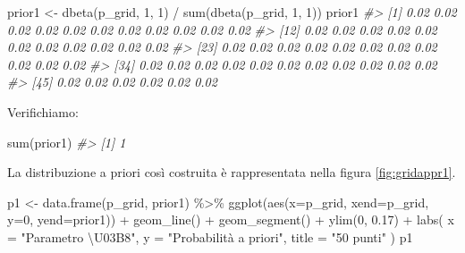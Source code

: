 \documentclass[
]{memoir}
\newenvironment{Shaded}{\begin{snugshade}}{\end{snugshade}}
\newcommand{\AttributeTok}[1]{\textcolor[rgb]{0.77,0.63,0.00}{#1}}
\newcommand{\CommentTok}[1]{\textcolor[rgb]{0.56,0.35,0.01}{\textit{#1}}}
\newcommand{\DecValTok}[1]{\textcolor[rgb]{0.00,0.00,0.81}{#1}}
\newcommand{\FloatTok}[1]{\textcolor[rgb]{0.00,0.00,0.81}{#1}}
\newcommand{\FunctionTok}[1]{\textcolor[rgb]{0.00,0.00,0.00}{#1}}
\newcommand{\NormalTok}[1]{#1}
\newcommand{\OtherTok}[1]{\textcolor[rgb]{0.56,0.35,0.01}{#1}}
\newcommand{\SpecialCharTok}[1]{\textcolor[rgb]{0.00,0.00,0.00}{#1}}
\newcommand{\StringTok}[1]{\textcolor[rgb]{0.31,0.60,0.02}{#1}}
\begin{document}
\begin{Shaded}
\begin{Highlighting}[]
\NormalTok{prior1 }\OtherTok{\textless{}{-}} \FunctionTok{dbeta}\NormalTok{(p\_grid, }\DecValTok{1}\NormalTok{, }\DecValTok{1}\NormalTok{) }\SpecialCharTok{/} \FunctionTok{sum}\NormalTok{(}\FunctionTok{dbeta}\NormalTok{(p\_grid, }\DecValTok{1}\NormalTok{, }\DecValTok{1}\NormalTok{))}
\NormalTok{prior1}
\CommentTok{\#\textgreater{}  [1] 0.02 0.02 0.02 0.02 0.02 0.02 0.02 0.02 0.02 0.02 0.02}
\CommentTok{\#\textgreater{} [12] 0.02 0.02 0.02 0.02 0.02 0.02 0.02 0.02 0.02 0.02 0.02}
\CommentTok{\#\textgreater{} [23] 0.02 0.02 0.02 0.02 0.02 0.02 0.02 0.02 0.02 0.02 0.02}
\CommentTok{\#\textgreater{} [34] 0.02 0.02 0.02 0.02 0.02 0.02 0.02 0.02 0.02 0.02 0.02}
\CommentTok{\#\textgreater{} [45] 0.02 0.02 0.02 0.02 0.02 0.02}
\end{Highlighting}
\end{Shaded}

\noindent
Verifichiamo:

\begin{Shaded}
\begin{Highlighting}[]
\FunctionTok{sum}\NormalTok{(prior1)}
\CommentTok{\#\textgreater{} [1] 1}
\end{Highlighting}
\end{Shaded}

\noindent
La distribuzione a priori così costruita è rappresentata nella figura \ref{fig:gridappr1}.

\begin{Shaded}
\begin{Highlighting}[]
\NormalTok{p1 }\OtherTok{\textless{}{-}} \FunctionTok{data.frame}\NormalTok{(p\_grid, prior1) }\SpecialCharTok{\%\textgreater{}\%}
  \FunctionTok{ggplot}\NormalTok{(}\FunctionTok{aes}\NormalTok{(}\AttributeTok{x=}\NormalTok{p\_grid, }\AttributeTok{xend=}\NormalTok{p\_grid, }\AttributeTok{y=}\DecValTok{0}\NormalTok{, }\AttributeTok{yend=}\NormalTok{prior1)) }\SpecialCharTok{+}
  \FunctionTok{geom\_line}\NormalTok{() }\SpecialCharTok{+}
  \FunctionTok{geom\_segment}\NormalTok{() }\SpecialCharTok{+}
  \FunctionTok{ylim}\NormalTok{(}\DecValTok{0}\NormalTok{, }\FloatTok{0.17}\NormalTok{) }\SpecialCharTok{+}
  \FunctionTok{labs}\NormalTok{(}
    \AttributeTok{x =} \StringTok{"Parametro \textbackslash{}U03B8"}\NormalTok{,}
    \AttributeTok{y =} \StringTok{"Probabilità a priori"}\NormalTok{,}
    \AttributeTok{title =} \StringTok{"50 punti"}
\NormalTok{  )}
\NormalTok{p1}
\end{Highlighting}
\end{Shaded}
\end{document}
